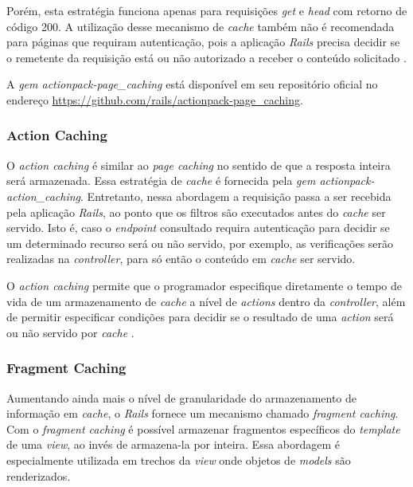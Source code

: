 Porém, esta estratégia funciona apenas para requisições \textit{get} e \textit{head} com retorno de código 200. A utilização desse mecanismo de \textit{cache} também não é recomendada para páginas que requiram autenticação, pois a aplicação \textit{Rails} precisa decidir se o remetente da requisição está ou não autorizado a receber o conteúdo solicitado \cite{actionpack-page-caching}.

A \textit{gem actionpack-page\_caching} está disponível em seu repositório oficial no endereço \href{https://github.com/rails/actionpack-page_caching}{https://github.com/rails/actionpack-page\_caching}.

\subsubsection{Action Caching}

O \textit{action caching} é similar ao \textit{page caching} no sentido de que a resposta inteira será armazenada. Essa estratégia de \textit{cache} é fornecida pela \textit{gem actionpack-action\_caching}. Entretanto, nessa abordagem a requisição passa a ser recebida pela aplicação \textit{Rails}, ao ponto que os filtros são executados antes do \textit{cache} ser servido. Isto é, caso o \textit{endpoint} consultado requira autenticação para decidir se um determinado recurso será ou não servido, por exemplo, as verificações serão realizadas na \textit{controller}, para só então o conteúdo em \textit{cache} ser servido.

O \textit{action caching} permite que o programador especifique diretamente o tempo de vida de um armazenamento de \textit{cache} a nível de \textit{actions} dentro da \textit{controller}, além de permitir especificar condições para decidir se o resultado de uma \textit{action} será ou não servido por \textit{cache} \cite{actionpack-action-caching}.

\subsubsection{Fragment Caching}

Aumentando ainda mais o nível de granularidade do armazenamento de informação em \textit{cache}, o \textit{Rails} fornece um mecanismo chamado \textit{fragment caching}. Com o \textit{fragment caching} é possível armazenar fragmentos específicos do \textit{template} de uma \textit{view}, ao invés de armazena-la por inteira. Essa abordagem é especialmente utilizada em trechos da \textit{view} onde objetos de \textit{models} são renderizados.

